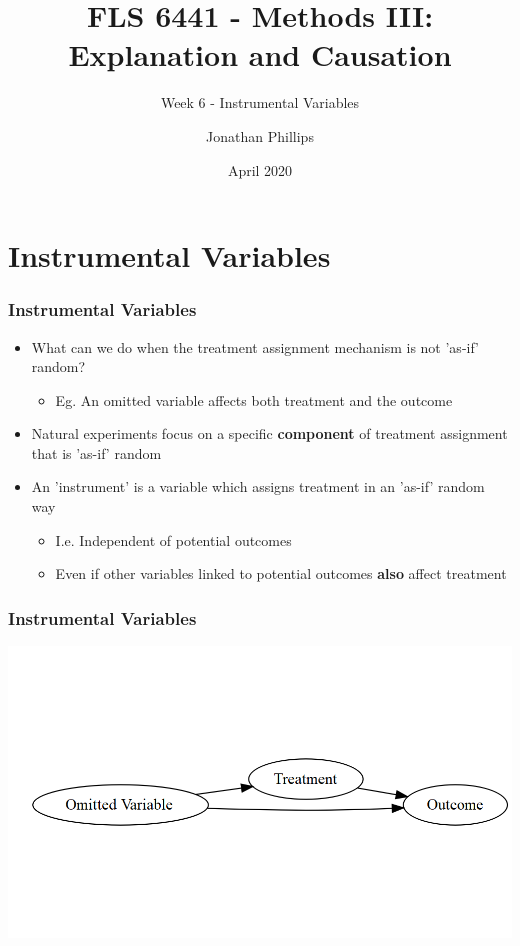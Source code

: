 \documentclass[xcolor=x11names,compress]{beamer}\usepackage[]{graphicx}\usepackage[]{color}
\title{FLS 6441 - Methods III: Explanation and Causation}
\subtitle{Week 6 - Instrumental Variables}
\author{Jonathan Phillips}
\date{April 2020}
\makeatletter
\def\maxwidth{ %
  \ifdim\Gin@nat@width>\linewidth
    \linewidth
  \else
    \Gin@nat@width
  \fi
}
\newenvironment{knitrout}{}{} %
\renewcommand{\(}{\begin{columns}}
\renewcommand{\)}{\end{columns}}
\newcommand{\<}[1]{\begin{column}{#1}}
\renewcommand{\>}{\end{column}}
\makeatother
\begin{document}
  

\frame{\titlepage}

\section{Instrumental Variables}

\begin{frame}
\frametitle{Instrumental Variables}
\begin{itemize}
\item What can we do when the treatment assignment mechanism is not 'as-if' random?
\pause
\begin{itemize}
\item Eg. An omitted variable affects both treatment and the outcome
\end{itemize}
\pause
\item Natural experiments focus on a specific \textbf{component} of treatment assignment that is 'as-if' random
\pause
\item An 'instrument' is a variable which assigns treatment in an 'as-if' random way
\pause
\begin{itemize}
\item I.e. Independent of potential outcomes
\pause
\item Even if other variables linked to potential outcomes \textbf{also} affect treatment
\end{itemize}
\end{itemize}
\end{frame}

\begin{frame}
\frametitle{Instrumental Variables}
\begin{knitrout}
\color{fgcolor}
\includegraphics[width=\maxwidth]{figure/dag1-1} 

\end{knitrout}
\end{frame}
\end{document}
